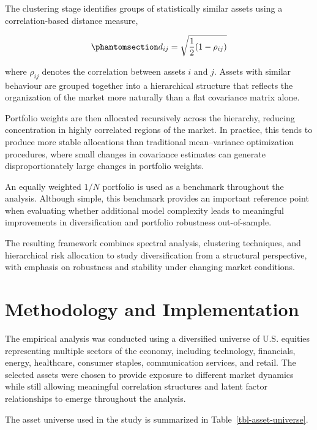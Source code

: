 \documentclass[
  12pt,
  letterpaper,
]{book}
\begin{document}
The clustering stage identifies groups of statistically similar assets
using a correlation-based distance measure,

\begin{equation}\phantomsection\label{eq-correlation-distance}{
d_{ij} = \sqrt{\frac{1}{2}(1 - \rho_{ij})}
}\end{equation}

where \(\rho_{ij}\) denotes the correlation between assets \(i\) and
\(j\). Assets with similar behaviour are grouped together into a
hierarchical structure that reflects the organization of the market more
naturally than a flat covariance matrix alone.

Portfolio weights are then allocated recursively across the hierarchy,
reducing concentration in highly correlated regions of the market. In
practice, this tends to produce more stable allocations than traditional
mean--variance optimization procedures, where small changes in
covariance estimates can generate disproportionately large changes in
portfolio weights.

An equally weighted \(1/N\) portfolio is used as a benchmark throughout
the analysis. Although simple, this benchmark provides an important
reference point when evaluating whether additional model complexity
leads to meaningful improvements in diversification and portfolio
robustness out-of-sample.

The resulting framework combines spectral analysis, clustering
techniques, and hierarchical risk allocation to study diversification
from a structural perspective, with emphasis on robustness and stability
under changing market conditions.

\section{Methodology and
Implementation}\label{methodology-and-implementation-1}

The empirical analysis was conducted using a diversified universe of
U.S. equities representing multiple sectors of the economy, including
technology, financials, energy, healthcare, consumer staples,
communication services, and retail. The selected assets were chosen to
provide exposure to different market dynamics while still allowing
meaningful correlation structures and latent factor relationships to
emerge throughout the analysis.

The asset universe used in the study is summarized in
Table~\ref{tbl-asset-universe}.
\end{document}
